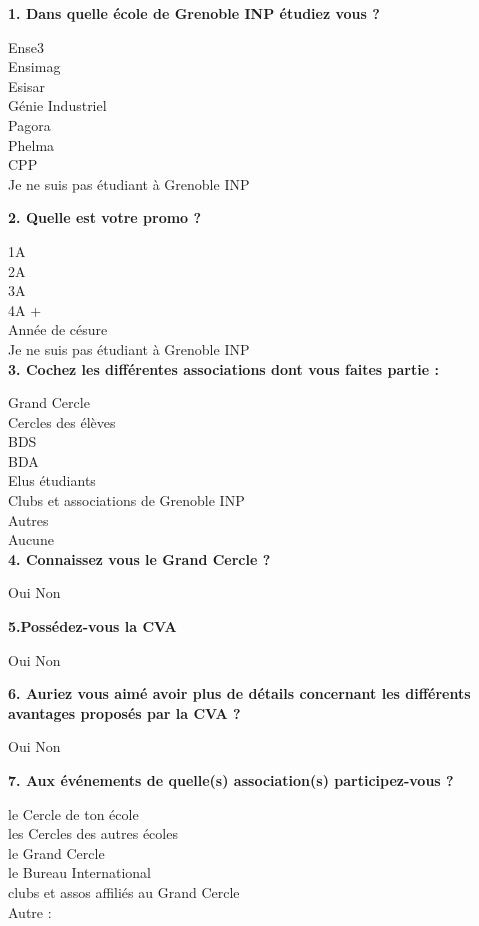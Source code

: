 \documentclass[a4paper, 11px]{article}
\begin{document}
\textbf{1. Dans quelle école de Grenoble INP étudiez vous ? }

\indent Ense3\\
\indent Ensimag\\
\indent Esisar\\
\indent Génie Industriel\\
\indent Pagora\\
\indent Phelma\\
\indent CPP\\
\indent Je ne suis pas étudiant à Grenoble INP


\textbf{2. Quelle est votre promo ? }

\indent 1A\\
\indent 2A\\
\indent 3A\\
\indent 4A +\\
\indent Année de césure\\
\indent Je ne suis pas étudiant à Grenoble INP\\


\textbf{3. Cochez les différentes associations dont vous faites partie : }

\indent Grand Cercle\\
\indent Cercles des élèves\\
\indent BDS\\
\indent BDA\\
\indent Elus étudiants\\
\indent Clubs et associations de Grenoble INP\\
\indent Autres\\
\indent Aucune\\


\textbf{4. Connaissez vous le Grand Cercle ? }

    Oui
    Non


\textbf{5.Possédez-vous la CVA }

    Oui
    Non


\textbf{6. Auriez vous aimé avoir plus de détails concernant les différents avantages proposés par la CVA ?}

    Oui
    Non


\textbf{7. Aux événements de quelle(s) association(s) participez-vous ? }

\indent le Cercle de ton école\\
\indent les Cercles des autres écoles\\
\indent le Grand Cercle\\
\indent le Bureau International\\
\indent clubs et assos affiliés au Grand Cercle\\
\indent Autre : 
\end{document}
